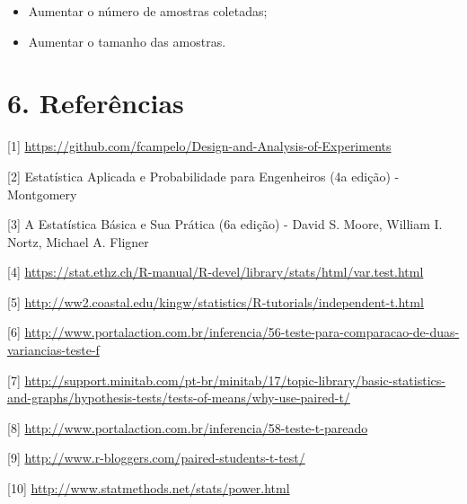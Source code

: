 \documentclass[]{article}
\begin{document}
\begin{itemize}
\itemsep1pt\parskip0pt
\item
  Aumentar o número de amostras coletadas;
\item
  Aumentar o tamanho das amostras.
\end{itemize}

\section{6. Referências}\label{referencias}

{[}1{]}
\url{https://github.com/fcampelo/Design-and-Analysis-of-Experiments}

{[}2{]} Estatística Aplicada e Probabilidade para Engenheiros (4a
edição) - Montgomery

{[}3{]} A Estatística Básica e Sua Prática (6a edição) - David S. Moore,
William I. Nortz, Michael A. Fligner

{[}4{]}
\url{https://stat.ethz.ch/R-manual/R-devel/library/stats/html/var.test.html}

{[}5{]}
\url{http://ww2.coastal.edu/kingw/statistics/R-tutorials/independent-t.html}

{[}6{]}
\url{http://www.portalaction.com.br/inferencia/56-teste-para-comparacao-de-duas-variancias-teste-f}

{[}7{]}
\url{http://support.minitab.com/pt-br/minitab/17/topic-library/basic-statistics-and-graphs/hypothesis-tests/tests-of-means/why-use-paired-t/}

{[}8{]}
\url{http://www.portalaction.com.br/inferencia/58-teste-t-pareado}

{[}9{]} \url{http://www.r-bloggers.com/paired-students-t-test/}

{[}10{]} \url{http://www.statmethods.net/stats/power.html}
\end{document}
